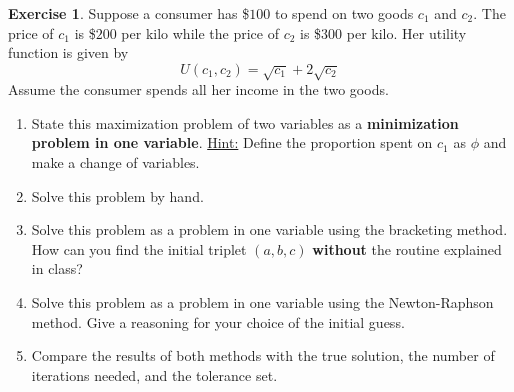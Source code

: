 \documentclass[a4paper,11pt]{article}
\theoremstyle{definition}
\newtheorem{exercise}{Exercise}
\begin{document}
\begin{exercise}
Suppose a consumer has \$$100$ to spend on two goods $c_1$ and $c_2$. The price of $c_1$ is \$$200$ per kilo while the price of $c_2$ is \$$300$ per kilo. Her utility function is given by
\[
U(c_1, c_2) = \sqrt{c_1} + 2\sqrt{c_2}
\]
Assume the consumer spends all her income in the two goods.
\begin{enumerate}
    \item State this maximization problem of two variables as a \textbf{minimization problem in one variable}. \underline{Hint:} Define the proportion spent on $c_1$ as $\phi$ and make a change of variables.
    \item Solve this problem by hand.
    \item Solve this problem as a problem in one variable using the bracketing method. How can you find the initial triplet $(a,b,c)$ \textbf{without} the routine explained in class? 
    \item Solve this problem as a problem in one variable using the Newton-Raphson method. Give a reasoning for your choice of the initial guess.
    \item Compare the results of both methods with the true solution, the number of iterations needed, and the tolerance set.
\end{enumerate}
\end{exercise}
\end{document}
